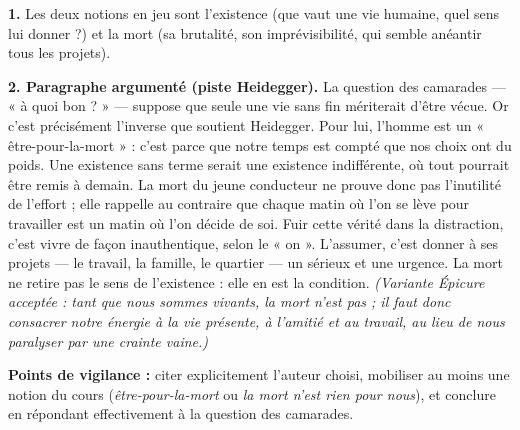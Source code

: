 \documentclass[11pt]{article}
\newcommand{\cle}[1]{{\popxbold\color{popdark}#1}}
\begin{document}
\begin{corrige}
\textbf{1.} Les deux notions en jeu sont l'\cle{existence} (que vaut une vie humaine, quel sens lui donner ?) et la \cle{mort} (sa brutalité, son imprévisibilité, qui semble anéantir tous les projets).

\textbf{2. Paragraphe argumenté (piste Heidegger).} La question des camarades — « à quoi bon ? » — suppose que seule une vie sans fin mériterait d'être vécue. Or c'est précisément l'inverse que soutient Heidegger. Pour lui, l'homme est un « être-pour-la-mort » : c'est parce que notre temps est compté que nos choix ont du poids. Une existence sans terme serait une existence indifférente, où tout pourrait être remis à demain. La mort du jeune conducteur ne prouve donc pas l'inutilité de l'effort ; elle rappelle au contraire que chaque matin où l'on se lève pour travailler est un matin où l'on décide de soi. Fuir cette vérité dans la distraction, c'est vivre de façon inauthentique, selon le « on ». L'assumer, c'est donner à ses projets — le travail, la famille, le quartier — un sérieux et une urgence. La mort ne retire pas le sens de l'existence : elle en est la condition. \emph{(Variante Épicure acceptée : tant que nous sommes vivants, la mort n'est pas ; il faut donc consacrer notre énergie à la vie présente, à l'amitié et au travail, au lieu de nous paralyser par une crainte vaine.)}

\textbf{Points de vigilance :} citer explicitement l'auteur choisi, mobiliser au moins une notion du cours (\emph{être-pour-la-mort} ou \emph{la mort n'est rien pour nous}), et conclure en répondant effectivement à la question des camarades.
\end{corrige}
\end{document}
